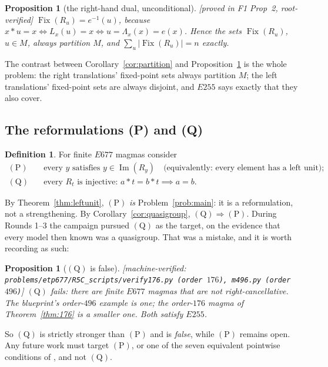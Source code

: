 \documentclass[11pt]{article}
\theoremstyle{plain}
\newtheorem{proposition}[theorem]{Proposition}
\theoremstyle{definition}
\newtheorem{definition}[theorem]{Definition}
\theoremstyle{remark}
\numberwithin{equation}{section}
\newcommand{\op}{\mathbin{*}}
\newcommand{\Fix}{\operatorname{Fix}}
\newcommand{\Imm}{\operatorname{Im}}
\newcommand{\statusbox}[1]{{\small\sloppy\textsf{[#1]}}}
\newcommand{\MV}[1]{\statusbox{machine-verified: \texttt{#1}}}
\newcommand{\PROVED}[1]{\statusbox{proved in #1, root-verified}}
\begin{document}
\begin{proposition}[the right-hand dual, unconditional]\label{prop:rightdual}
\PROVED{F1 Prop~2}
$\Fix(R_u) = e^{-1}(u)$, because $x\op u = x \iff L_x(u) = x \iff u = \Lambda_x(x) = e(x)$.
Hence the sets $\Fix(R_u)$, $u\in M$, \emph{always} partition $M$, and
$\sum_u |\Fix(R_u)| = n$ exactly.
\end{proposition}

The contrast between Corollary~\ref{cor:partition} and Proposition~\ref{prop:rightdual} is
the whole problem: the right translations' fixed-point sets always partition $M$; the left
translations' fixed-point sets are always disjoint, and $E255$ says exactly that they also
cover.

\subsection{The reformulations (P) and (Q)}

\begin{definition}\label{def:PQ}
For finite $E677$ magmas consider
\begin{align*}
  (\mathrm{P}) &\quad \text{every $y$ satisfies } y\in\Imm(R_y)
                \quad\text{(equivalently: every element has a left unit);}\\
  (\mathrm{Q}) &\quad \text{every $R_t$ is injective: } a\op t = b\op t \implies a = b .
\end{align*}
\end{definition}

By Theorem~\ref{thm:leftunit}, $(\mathrm{P})$ \emph{is} Problem~\ref{prob:main}: it is a
reformulation, not a strengthening. By Corollary~\ref{cor:quasigroup},
$(\mathrm{Q})\Rightarrow(\mathrm{P})$. During Rounds 1--3 the campaign pursued $(\mathrm{Q})$
as the target, on the evidence that every model then known was a quasigroup. That was a
mistake, and it is worth recording as such:

\begin{proposition}[$(\mathrm{Q})$ is false]\label{prop:Qfalse}
\MV{problems\slash etp677\slash R5C\_scripts\slash verify176.py (order $176$),
m496.py (order $496$)}
$(\mathrm{Q})$ fails: there are finite $E677$ magmas that are not right-cancellative. The
blueprint's order-$496$ example \cite[\S13.1]{blueprint} is one; the order-$176$ magma of
Theorem~\ref{thm:176} is a smaller one. Both satisfy $E255$.
\end{proposition}

So $(\mathrm{Q})$ is strictly stronger than $(\mathrm{P})$ and is \emph{false}, while
$(\mathrm{P})$ remains open. Any future work must target $(\mathrm{P})$, or one of the seven
equivalent pointwise conditions of \cite[Lemma~13.2]{blueprint}, and not $(\mathrm{Q})$.
\end{document}
